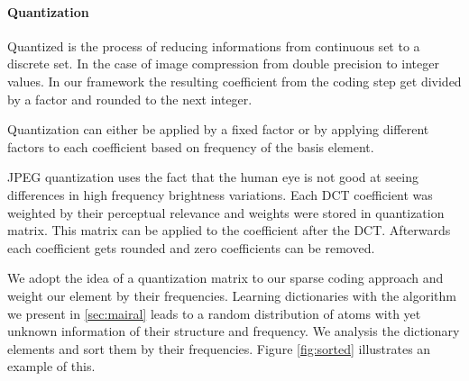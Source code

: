 \paragraph{Quantization}
Quantized is the process of reducing informations from continuous set to a
discrete set. In the case of image compression from double precision to integer
values. In our framework the resulting coefficient from the coding step get
divided by a factor and rounded to the next integer.  

Quantization can either be applied by a fixed factor or by applying different 
factors to each coefficient based on frequency of the basis element.

JPEG quantization uses the fact that the human eye is not good at seeing
differences in high frequency brightness variations. Each DCT coefficient was
weighted by their perceptual relevance and weights were stored in quantization
matrix. This matrix can be applied to the coefficient after the DCT. 
Afterwards each coefficient gets rounded and zero coefficients can be removed.

We adopt the idea of a quantization matrix to our sparse coding approach and
weight our element by their frequencies. Learning dictionaries with the
algorithm we present in \ref{sec:mairal} leads to a random distribution of atoms
with yet unknown information of their structure and frequency. We analysis the
dictionary elements and sort them by their frequencies. Figure 
\ref{fig:sorted} illustrates an example of this.


